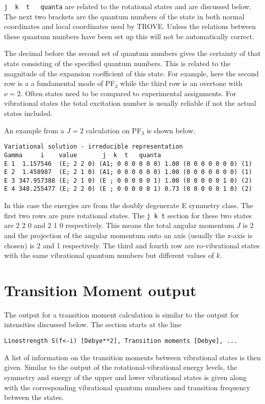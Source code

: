 \verb|j  k  t   quanta| are related to the rotational
states and are discussed below. The next two brackets are the quantum numbers of the state in both normal coordinates and
local coordinates used by TROVE. Unless the relations between these quantum numbers have been set up this will not be
automatically correct.

 The decimal before the second set of quantum numbers gives the certainty of that state consisting of 
the specified quantum numbers. This is related to the magnitude of the expansion coefficient of this state. 
For example, here the second row is a a fundamental mode of PF$_3$ while the third row is an overtone with $\nu = 2$. Often
states need to be compared to experimental assignments. For vibrational states the total excitation number is usually reliable
if not the actual states included. 

An example from a $J=2$ calculation on PF$_3$ is shown below.
\begin{verbatim}
Variational solution - irreducible representation
Gamma     i    value       j  k  t   quanta
E 1  1.157546  (E; 2 2 0) (A1; 0 0 0 0 0 0) 1.00 (0 0 0 0 0 0 0) (1)
E 2  1.458987  (E; 2 1 0) (A1; 0 0 0 0 0 0) 1.00 (0 0 0 0 0 0 0) (1)
E 3 347.957388 (E; 2 1 0) (E ; 0 0 0 0 0 1) 1.00 (0 0 0 0 0 1 0) (2)
E 4 348.255477 (E; 2 2 0) (E ; 0 0 0 0 0 1) 0.73 (0 0 0 0 0 1 0) (2)
\end{verbatim}
In this case the energies are from the doubly degenerate E symmetry class. The first two rows are pure rotational states.
The \verb|j k t| section for these two states are 2 2 0 and 2 1 0 respectively. This means the total angular momentum $J$
is 2 and the projection of the angular momentum onto an axis (usually the z-axis is chosen) is 2 and 1 respectively. The 
third and fourth row are ro-vibrational states with the same vibrational quantum numbers but different values of $k$.


\section{Transition Moment output}

The output for a transition moment calculation is similar to the output for intensities discussed below. 
The section starts at the line
\begin{verbatim}
Linestrength S(f<-i) [Debye**2], Transition moments [Debye], ...
\end{verbatim}
A list of information on the transition moments between vibrational states is then given. Similar to the output of the 
rotational-vibrational energy levels, the symmetry and energy of the upper and lower vibrational states is given along with
the corresponding vibrational quantum numbers and transition frequency between the states. 

